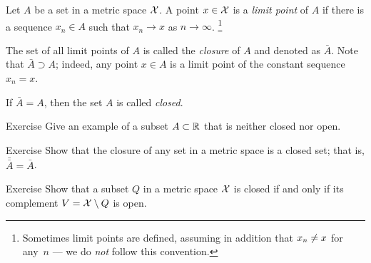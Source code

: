 Let $A$ be a set in a metric space $\mathcal{X}$.
A point $x\in \mathcal{X}$ is a \emph{limit point} of $A$ if there is a sequence $x_n\in A$ such that $x_n\to x$ as $n\to\infty$.%
\footnote{Sometimes limit points are defined, assuming in addition that $x_n\z\ne x$ for any~$n$ --- we do \textit{not} follow this convention.}

The set of all limit points of $A$ is called the \emph{closure} of $A$ and denoted as $\bar A$.
Note that $\bar A\supset A$;
indeed, any point $x\in A$ is a limit point of the constant sequence $x_n=x$.

If $\bar A= A$, then the set $A$ is called \emph{closed}.

\begin{thm}{Exercise}\label{ex:nonclosed-nonopen}
Give an example of a subset $A\subset\mathbb{R}$ that is neither closed nor open. 
\end{thm}

\begin{thm}{Exercise}\label{ex:closure-is-closed}
Show that the closure of any set in a metric space is a closed set;
that is, $\bar{\bar A}= \bar A$.
\end{thm}

\begin{thm}{Exercise}\label{ex:closed-open-complement}
Show that a subset $Q$ in a metric space $\mathcal{X}$ is closed if and only if its complement $V=\mathcal{X}\setminus Q$ is open.
\end{thm}
